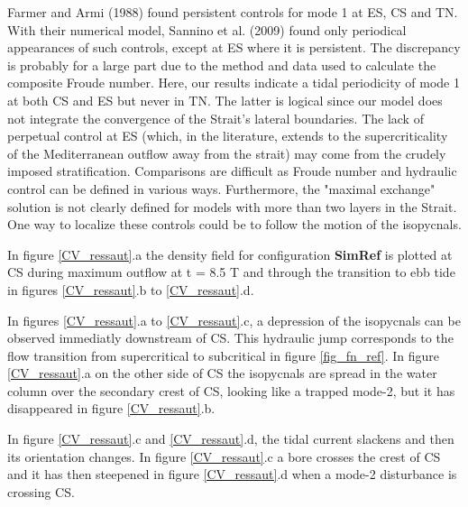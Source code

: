 Farmer and Armi (1988) found persistent controls for mode 1 at ES, CS and TN. With their numerical model, Sannino et al. (2009) found only periodical appearances of such controls, except at ES where it is persistent. The discrepancy is probably for a large part due to the method and data used to calculate the composite Froude number. Here, our results indicate a tidal periodicity of mode 1 at both CS and ES but never in TN. The latter is logical since our model does not integrate the convergence of the Strait's lateral boundaries. The lack of perpetual control at ES (which, in the literature, extends to the supercriticality of the Mediterranean outflow away from the strait) may come from the crudely imposed stratification. 
Comparisons are difficult as Froude number and hydraulic control can be defined in various ways. Furthermore, the "maximal exchange" solution is not clearly defined for models with more than two layers in the Strait. One way to localize these controls could be to follow the motion of the isopycnals.

In figure \ref{CV_ressaut}.a the density field for configuration \textbf{SimRef} is plotted at CS during maximum outflow at t = 8.5 T and through the transition to ebb tide in figures \ref{CV_ressaut}.b to \ref{CV_ressaut}.d.

In figures \ref{CV_ressaut}.a to \ref{CV_ressaut}.c, a depression of the isopycnals can be observed immediatly downstream of CS. This hydraulic jump corresponds to the flow transition from supercritical to subcritical in figure \ref{fig_fn_ref}. In figure \ref{CV_ressaut}.a on the other side of CS the isopycnals are spread in the water column over the secondary crest of CS, looking like a trapped mode-2, but it has disappeared in figure \ref{CV_ressaut}.b.

In figure \ref{CV_ressaut}.c and \ref{CV_ressaut}.d, the tidal current slackens and then its orientation changes. In figure \ref{CV_ressaut}.c a bore crosses the crest of CS and it has then steepened in figure \ref{CV_ressaut}.d when a mode-2 disturbance is crossing CS.%

